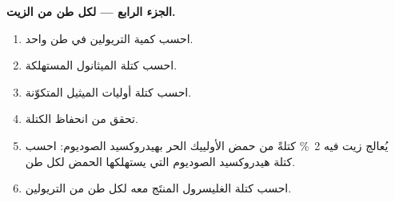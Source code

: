 \begin{problem}
\medskip
\noindent\textbf{الجزء الرابع --- لكل طن من الزيت.}
\begin{enumerate}[resume]
  \item احسب كمية التريولين في طن واحد.
  \item احسب كتلة الميثانول المستهلكة.
  \item احسب كتلة أوليات الميثيل المتكوّنة.
  \item تحقق من انحفاظ الكتلة.
  \item يُعالج زيت فيه 2~\% كتلةً من حمض الأولييك الحر بهيدروكسيد الصوديوم: احسب كتلة
        هيدروكسيد الصوديوم التي يستهلكها الحمض لكل طن.
  \item احسب كتلة الغليسرول المنتَج معه لكل طن من التريولين.
\end{enumerate}
\end{problem}
